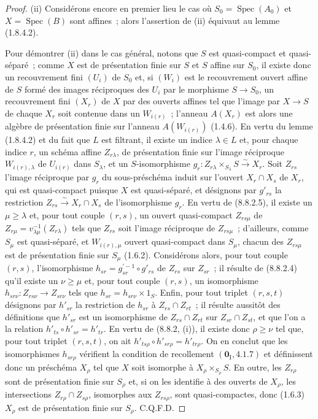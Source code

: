 \begin{proof}
(ii) Considérons encore en premier lieu le cas où $S_0=\operatorname{Spec}(A_0)$ et
$X=\operatorname{Spec}(B)$ sont affines~; alors l'assertion de (ii) équivaut
au lemme (1.8.4.2).

Pour démontrer (ii) dans le cas général, notons que $S$ est quasi-compact et
quasi-séparé~; comme $X$ est de présentation finie sur $S$ et $S$ affine sur
$S_0$, il existe donc un recouvrement fini $(U_i)$ de $S_0$ et, si $(W_i)$ est
le recouvrement ouvert affine de $S$ formé des images réciproques des $U_i$
par le morphisme $S\to S_0$, un recouvrement fini $(X_r)$ de $X$ par des
ouverts affines tel que l'image par $X\to S$ de chaque $X_r$ soit contenue
dans un $W_{i(r)}$~; l'anneau $A(X_r)$ est alors une algèbre de présentation
finie sur l'anneau $A(W_{i(r)})$ (1.4.6). En vertu du lemme (1.8.4.2) et du
fait que $L$ est filtrant, il existe un indice $\lambda\in L$ et, pour chaque
indice $r$, un schéma affine $Z_{r\lambda}$, de présentation finie sur l'image
réciproque $W_{i(r),\lambda}$ de $U_{i(r)}$ dans $S_\lambda$, et un
$S$-isomorphisme
$g_r:Z_{r\lambda}\times_{S_\lambda}S\xrightarrow{\sim}X_r$. Soit $Z_{rs}$
l'image réciproque par $g_r$ du sous-préschéma induit sur l'ouvert
$X_r\cap X_s$ de $X_r$, qui est quasi-compact puisque $X$ est quasi-séparé,
et désignons par $g'_{rs}$ la restriction
$Z_{rs}\xrightarrow{\sim}X_r\cap X_s$ de l'isomorphisme $g_r$. En vertu de
(8.8.2.5), il existe un $\mu\geq\lambda$ et, pour tout couple $(r,s)$, un
ouvert quasi-compact $Z_{rs\mu}$ de
$Z_{r\mu}=v_{\lambda\mu}^{-1}(Z_{r\lambda})$ tels que $Z_{rs}$ soit l'image
réciproque de $Z_{rs\mu}$~; d'ailleurs, comme $S_\mu$ est quasi-séparé, et
$W_{i(r),\mu}$ ouvert quasi-compact dans $S_\mu$, chacun des $Z_{rs\mu}$ est
de présentation finie sur $S_\mu$ (1.6.2). Considérons alors, pour tout
couple $(r,s)$, l'isomorphisme
$h_{sr}=g_{sr}^{'-1}\circ g'_{rs}$ de $Z_{rs}$ sur $Z_{sr}$~; il résulte de
(8.8.2.4) qu'il existe un $\nu\geq\mu$ et, pour tout couple $(r,s)$, un
isomorphisme $h_{sr\nu}:Z_{rs\nu}\to Z_{sr\nu}$ tels que
$h_{sr}=h_{sr\nu}\times1_S$. Enfin, pour tout triplet $(r,s,t)$ désignons par
$h'_{sr}$ la restriction de $h_{sr}$ à
$Z_{rs}\cap Z_{rt}$~; il résulte aussitôt des définitions que $h'_{sr}$ est un
isomorphisme de $Z_{rs}\cap Z_{rt}$ sur $Z_{sr}\cap Z_{st}$, et que l'on a la
relation $h'_{ts}\circ h'_{sr}=h'_{tr}$. En vertu de (8.8.2, (i)), il existe
donc $\rho\geq\nu$ tel que, pour tout triplet $(r,s,t)$, on ait
$h'_{ts\rho}\circ h'_{sr\rho}=h'_{tr\rho}$. On en conclut que les
isomorphismes $h_{sr\rho}$ vérifient la condition de recollement
$(\mathbf{0}_{\mathrm I}, 4.1.7)$ et définissent donc un préschéma $X_\rho$ tel que $X$
soit isomorphe à $X_\rho\times_{S_\rho}S$. En outre, les $Z_{r\rho}$ sont de
présentation finie sur $S_\rho$ et, si on les identifie à des ouverts de
$X_\rho$, les intersections $Z_{r\rho}\cap Z_{s\rho}$, isomorphes aux
$Z_{rs\rho}$, sont quasi-compactes, donc (1.6.3) $X_\rho$ est de
présentation finie sur $S_\rho$. C.Q.F.D.
\end{proof}

